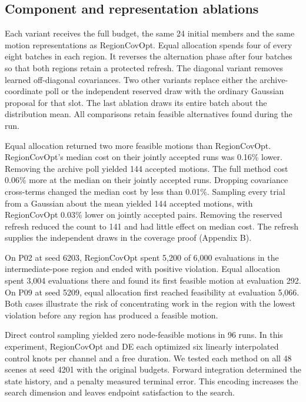 \subsection{Component and representation ablations}

Each variant receives the full budget, the same 24 initial members and the same motion representations as RegionCovOpt. Equal allocation spends four of every eight batches in each region. It reverses the alternation phase after four batches so that both regions retain a protected refresh. The diagonal variant removes learned off-diagonal covariances. Two other variants replace either the archive-coordinate poll or the independent reserved draw with the ordinary Gaussian proposal for that slot. The last ablation draws its entire batch about the distribution mean. All comparisons retain feasible alternatives found during the run.

Equal allocation returned two more feasible motions than RegionCovOpt. RegionCovOpt's median cost on their jointly accepted runs was 0.16\% lower. Removing the archive poll yielded 144 accepted motions. The full method cost 0.06\% more at the median on their jointly accepted runs. Dropping covariance cross-terms changed the median cost by less than 0.01\%. Sampling every trial from a Gaussian about the mean yielded 144 accepted motions, with RegionCovOpt 0.03\% lower on jointly accepted pairs. Removing the reserved refresh reduced the count to 141 and had little effect on median cost. The refresh supplies the independent draws in the coverage proof (Appendix B).

On P02 at seed 6203, RegionCovOpt spent 5,200 of 6,000 evaluations in the intermediate-pose region and ended with positive violation. Equal allocation spent 3,004 evaluations there and found its first feasible motion at evaluation 292. On P09 at seed 5209, equal allocation first reached feasibility at evaluation 5,066. Both cases illustrate the risk of concentrating work in the region with the lowest violation before any region has produced a feasible motion.

Direct control sampling yielded zero node-feasible motions in 96 runs. In this experiment, RegionCovOpt and DE each optimized six linearly interpolated control knots per channel and a free duration. We tested each method on all 48 scenes at seed 4201 with the original budgets. Forward integration determined the state history, and a penalty measured terminal error. This encoding increases the search dimension and leaves endpoint satisfaction to the search.


